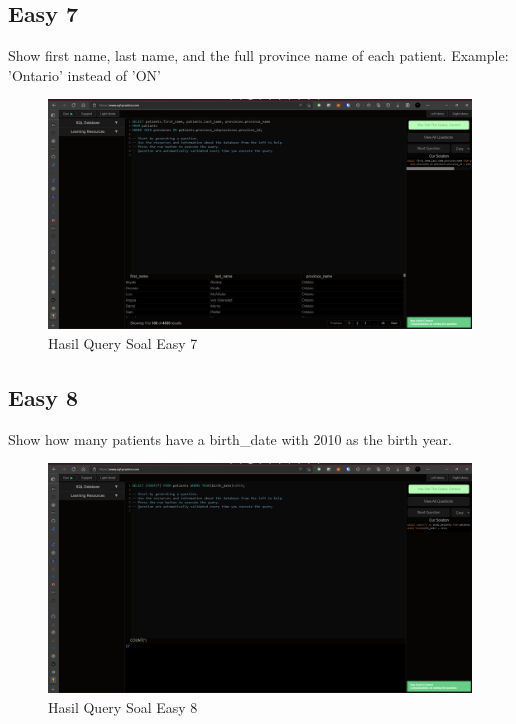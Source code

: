 \documentclass[]{article}
\begin{document}
\subsection{Easy 7}
Show first name, last name, and the full province name of each patient. Example: 'Ontario' instead of 'ON'

\begin{figure}[H]
    \centering
    \includegraphics[width=12cm]{easy-7.png}
    \caption{Hasil Query Soal Easy 7}
\end{figure}
\subsection{Easy 8}
Show how many patients have a birth\_date with 2010 as the birth year.

\begin{figure}[H]
    \centering
    \includegraphics[width=12cm]{easy-8.png}
    \caption{Hasil Query Soal Easy 8}
\end{figure}
\end{document}
